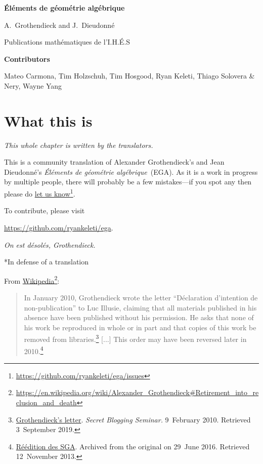 \documentclass[openany,oneside]{amsbook}
\makeatletter
\theoremstyle{ega-env-style}
\theoremstyle{ega-thm-env-style}
\theoremstyle{ega-defn-env-style}
\def\section{\@startsection{section}{1}%
  \z@{.7\linespacing\@plus\linespacing}{.5\linespacing}%
  {\normalfont\bfseries\Large\scshape\centering}}
\makeatother
\begin{document}
\begin{titlepage}
\pagestyle{empty}
\setcounter{page}{1}
\centerline{\LARGE\bfseries \'El\'ements de g\'eom\'etrie alg\'ebrique}
\vskip0.5in
\noindent
\centerline{A.~Grothendieck and J.~Dieudonn\'e}
\centerline{Publications math\'ematiques de l'I.H.\'E.S}
\vskip0.5in
\noindent
\centerline{\bfseries Contributors}
\centerline{Mateo Carmona, Tim Holzschuh, Tim Hosgood, Ryan Keleti, Thiago Solovera \& Nery, Wayne Yang}
\end{titlepage}
\setcounter{tocdepth}{2}
\tableofcontents

\chapter*{What this is}

\label{section:what}

\noindent
\emph{This whole chapter is written by the translators.}

\bigskip

\noindent
This is a community translation of Alexander Grothendieck's and Jean Dieudonn\'e's \emph{\'El\'ements de g\'eom\'etrie alg\'ebrique}~(EGA).
As it is a work in progress by multiple people, there will probably be a few mistakes---if you spot any then please do \href{https://github.com/ryankeleti/ega/issues}{let us know}\footnote{\url{https://github.com/ryankeleti/ega/issues}}.

\noindent
To contribute, please visit
\begin{center}
  \url{https://github.com/ryankeleti/ega}.
\end{center}

\noindent
\emph{On est d\'esol\'es, Grothendieck.}

\section*{In defense of a translation}

From \href{https://en.wikipedia.org/wiki/Alexander_Grothendieck\#Retirement_into_reclusion_and_death}{Wikipedia}\footnote{\url{https://en.wikipedia.org/wiki/Alexander_Grothendieck\#Retirement_into_reclusion_and_death}}:

\begin{quote}
In January 2010, Grothendieck wrote the letter ``D\'eclaration d'intention de non-publication'' to Luc Illusie, claiming that all materials published in his absence have been published without his permission.
He asks that none of his work be reproduced in whole or in part and that copies of this work be removed from libraries.\footnote{\href{https://sbseminar.wordpress.com/2010/02/09/grothendiecks-letter/}{Grothendieck's letter}. \emph{Secret Blogging Seminar.} 9~February 2010. Retrieved 3~September 2019.}
[...]
This order may have been reversed later in 2010.\footnote{\href{https://web.archive.org/web/20160629235119/http://www.math.u-psud.fr/~laszlo/sga4.html}{R\'e\'edition des SGA}. Archived from the original on 29~June 2016. Retrieved 12~November 2013.}
\end{quote}
\end{document}
